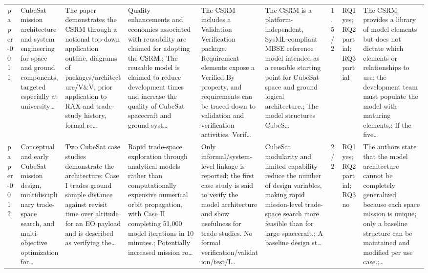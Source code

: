 \documentclass[10pt]{article}
\begin{document}
\begin{landscape}
\begin{longtable}{p{1.0cm}p{2.4cm}p{3.1cm}p{3.7cm}p{3.4cm}p{3.1cm}p{1.0cm}p{1.8cm}p{3.4cm}}
paper-0011 & CubeSat mission architecture and system engineering for space and ground components, targeted especially at university… & The paper demonstrates the CSRM through a notional top-down application outline, diagrams of packages/architecture/V\&V, prior application to RAX and trade-study history, formal re… & Quality enhancements and economies associated with reusability are claimed for adopting the CSRM.; The reusable model is claimed to reduce development times and increase the quality of CubeSat spacecraft and ground-syst… & The CSRM includes a Validation Verification package. Requirement elements expose a Verified By property, and requirements can be traced down to validation and verification activities. Verif… & The CSRM is a platform-independent, SysML-compliant MBSE reference model intended as a reusable starting point for CubeSat space and ground logical architecture.; The model structures CubeS… & 1.5/2 & RQ1 yes; RQ2 partial; RQ3 partial & The CSRM provides a library of model elements but does not dictate which elements or relationships to use; the development team must populate the model with maturing elements.; If the five… \\
paper-0012 & Conceptual and early CubeSat mission design, multidisciplinary trade-space search, and multi-objective optimization for… & Two CubeSat case studies demonstrate the architecture: Case I trades ground sample distance against revisit time over altitude for an EO payload and is described as verifying the… & Rapid trade-space exploration through analytical models rather than computationally expensive numerical orbit propagation, with Case II completing 51,000 model iterations in 10 minutes.; Potentially increased mission ro… & Only informal/system-level linkage is reported: the first case study is said to verify the model architecture and show usefulness for trade studies. No formal verification/validation/test/I… & CubeSat modularity and limited capability reduce the number of design variables, making rapid mission-level trade-space search more feasible than for large spacecraft.; A baseline design st… & 2/2 & RQ1 yes; RQ2 partial; RQ3 no & The authors state that the model architecture cannot be completely generalized because each space mission is unique; only a baseline structure can be maintained and modified per use case.;… \\

\end{longtable}
\end{landscape}
\end{document}

